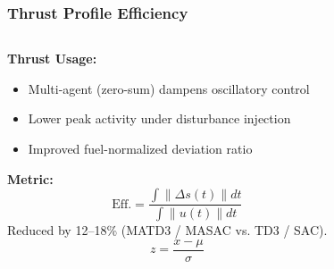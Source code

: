 \begin{frame}
  \frametitle{Thrust Profile Efficiency}
  \vspace{-0.4cm}
  \begin{columns}[T]
    \begin{column}{0.52\textwidth}
      \textbf{Thrust Usage:}
      \begin{itemize}\setlength{\itemsep}{3pt}
        \item Multi-agent (zero-sum) dampens oscillatory control
        \item Lower peak activity under disturbance injection
        \item Improved fuel-normalized deviation ratio
      \end{itemize}
      \textbf{Metric:}
      \[
        \text{Eff.} = \frac{\int \| \Delta s(t)\| dt}{\int \|u(t)\| dt}
      \]
      Reduced by 12--18\% (MATD3 / MASAC vs. TD3 / SAC).
      \[
        z = \frac{x - \mu}{\sigma}
      \]
    \end{column}
    \begin{column}{0.48\textwidth}
      \begin{figure}
        \centering
        \hfill

\end{figure}
\end{column}
\end{columns}
\end{frame}
